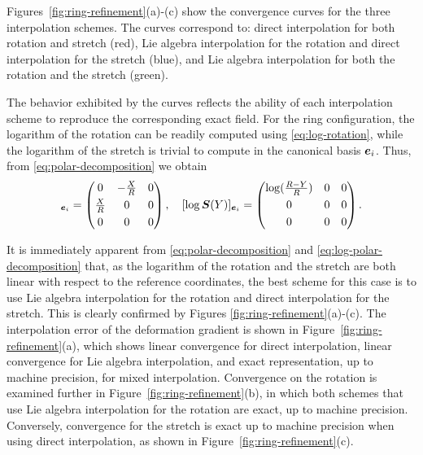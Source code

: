 \documentclass[12pt]{article}
\newcommand{\mbs}[1]{\boldsymbol{#1}}
\def\bS{{\mbs{S}}} \def\bT{{\mbs{T}}} \def\bU{{\mbs{U}}}
\begin{document}
Figures~\ref{fig:ring-refinement}(a)-(c) show the convergence curves
for the three interpolation schemes. The curves correspond to: direct
interpolation for both rotation and stretch (red), Lie algebra
interpolation for the rotation and direct interpolation for the
stretch (blue), and Lie algebra interpolation for both the rotation
and the stretch (green).

The behavior exhibited by the curves reflects the ability of each interpolation
scheme to reproduce the corresponding exact field. For the ring configuration,
the logarithm of the rotation can be readily computed using
\eqref{eq:log-rotation}, while the logarithm of the stretch is trivial to
compute in the canonical basis $\be_i$. Thus, from
\eqref{eq:polar-decomposition} we obtain
\begin{equation}
  [\log \bR(X)]_{\be_i} =
  \begin{pmatrix}
    0 & - \frac{X}{R} & 0
    \\[0.3em]
    \frac{X}{R} & 0  & 0
    \\[0.3em]
    0 & 0 & 0
  \end{pmatrix},
  \quad
  [\log \bS(Y)]_{\be_i} =
  \begin{pmatrix}
    \log (\frac{R-Y}{R})  & 0 & 0
    \\[0.3em]
    0 & 0 & 0
    \\[0.3em]
    0 & 0 & 0
  \end{pmatrix}.
  \label{eq:log-polar-decomposition} 
\end{equation}

It is immediately apparent from \eqref{eq:polar-decomposition} and
\eqref{eq:log-polar-decomposition} that, as the logarithm of the
rotation and the stretch are both linear with respect to the reference
coordinates, the best scheme for this case is to use Lie algebra
interpolation for the rotation and direct interpolation for the
stretch. This is clearly confirmed by Figures
\ref{fig:ring-refinement}(a)-(c). The interpolation error of the
deformation gradient is shown in Figure~\ref{fig:ring-refinement}(a),
which shows linear convergence for direct interpolation, linear
convergence for Lie algebra interpolation, and exact representation,
up to machine precision, for mixed interpolation. Convergence on the
rotation is examined further in Figure~\ref{fig:ring-refinement}(b),
in which both schemes that use Lie algebra interpolation for the
rotation are exact, up to machine precision. Conversely, convergence
for the stretch is exact up to machine precision when using direct
interpolation, as shown in Figure~\ref{fig:ring-refinement}(c).
\end{document}
